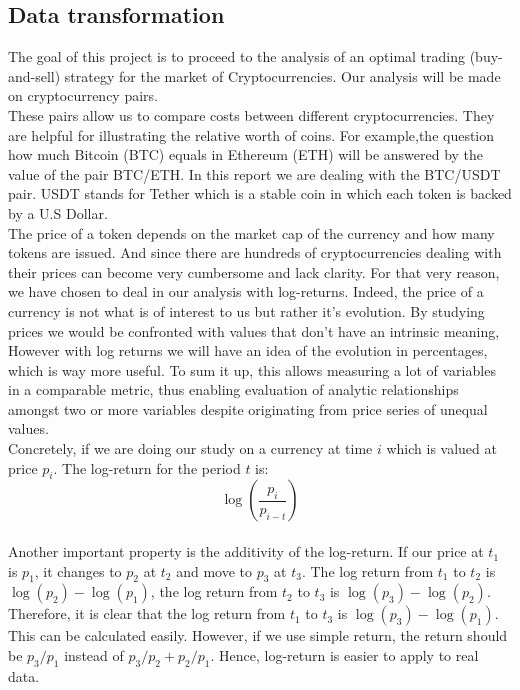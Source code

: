\documentclass[twoside]{report}
\begin{document}
\begin{spacing}{1}
\begin{itemize}
\end{itemize}



\subsection{Data transformation}

The goal of this project is to proceed to the analysis of an optimal trading (buy-and-sell) strategy for the market of Cryptocurrencies. Our analysis will be made on cryptocurrency pairs.\\
These pairs allow us to compare costs between different cryptocurrencies. They are helpful for illustrating the relative worth of coins. For example,the question how much Bitcoin (BTC) equals in Ethereum (ETH) will be answered by the value of the pair BTC/ETH.
In this report we are dealing with the BTC/USDT pair. USDT stands for Tether which is a stable coin in which each token is backed by a U.S Dollar.\\
The price of a token depends on the market cap of the currency and how many tokens are issued. And since there are hundreds of cryptocurrencies dealing with their prices can become very cumbersome and lack clarity. For that very reason, we have chosen to deal in our analysis with log-returns.
Indeed, the price of a currency is not what is of interest to us but rather it's evolution. By studying prices we would be confronted with values that don't have an intrinsic meaning, However with log returns we will have an idea of the evolution in percentages, which is way more useful. To sum it up, this allows measuring a lot of variables in a comparable metric, thus enabling evaluation of analytic relationships amongst two or more variables despite originating from price series of unequal values. \\
Concretely, if we are doing our study on a currency at time $i$ which is valued at price $p_i$. The log-return for the period $t$ is:
$$\log\left(\frac{p_i}{p_{i-t}}\right)$$\\

Another important property is the additivity of the log-return. If our price at $t_1$ is $p_1$, it changes to $p_2$ at $t_2$ and move to $p_3$ at $t_3$. The log return from $t_1 $ to $t_2$ is $\log (p_2) - \log (p_1)$, the log return from $t_2 $ to $t_3$ is $\log (p_3) - \log (p_2)$. Therefore, it is clear that the log return from $t_1 $ to $t_3$ is $\log (p_3) - \log (p_1)$. This can be calculated easily. However, if we use simple return, the return should be $p_3/p_1$ instead of $p_3/p_2 + p_2/p_1$. Hence, log-return is easier to apply to real data.


\end{spacing}
\end{document}
